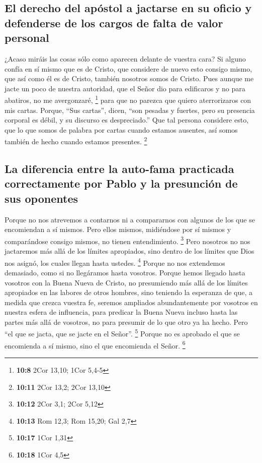 \hypertarget{el-derecho-del-apuxf3stol-a-jactarse-en-su-oficio-y-defenderse-de-los-cargos-de-falta-de-valor-personal}{%
\subsection{El derecho del apóstol a jactarse en su oficio y defenderse
de los cargos de falta de valor
personal}\label{el-derecho-del-apuxf3stol-a-jactarse-en-su-oficio-y-defenderse-de-los-cargos-de-falta-de-valor-personal}}

 ¿Acaso miráis las cosas sólo como aparecen delante de
vuestra cara? Si alguno confía en sí mismo que es de Cristo, que
considere de nuevo esto consigo mismo, que así como él es de Cristo,
también nosotros somos de Cristo.  Pues aunque me jacte un
poco de nuestra autoridad, que el Señor dio para edificaros y no para
abatiros, no me avergonzaré, \footnote{\textbf{10:8} 2Cor 13,10; 1Cor
  5,4-5}  para que no parezca que quiero aterrorizaros con
mis cartas.  Porque, ``Sus cartas'', dicen, ``son pesadas
y fuertes, pero su presencia corporal es débil, y su discurso es
despreciado.''  Que tal persona considere esto, que lo
que somos de palabra por cartas cuando estamos ausentes, así somos
también de hecho cuando estamos presentes. \footnote{\textbf{10:11} 2Cor
  13,2; 2Cor 13,10}

\hypertarget{la-diferencia-entre-la-auto-fama-practicada-correctamente-por-pablo-y-la-presunciuxf3n-de-sus-oponentes}{%
\subsection{La diferencia entre la auto-fama practicada correctamente
por Pablo y la presunción de sus
oponentes}\label{la-diferencia-entre-la-auto-fama-practicada-correctamente-por-pablo-y-la-presunciuxf3n-de-sus-oponentes}}

 Porque no nos atrevemos a contarnos ni a compararnos con
algunos de los que se encomiendan a sí mismos. Pero ellos mismos,
midiéndose por sí mismos y comparándose consigo mismos, no tienen
entendimiento. \footnote{\textbf{10:12} 2Cor 3,1; 2Cor 5,12}
 Pero nosotros no nos jactaremos más allá de los límites
apropiados, sino dentro de los límites que Dios nos asignó, los cuales
llegan hasta ustedes. \footnote{\textbf{10:13} Rom 12,3; Rom 15,20; Gal
  2,7}  Porque no nos extendemos demasiado, como si no
llegáramos hasta vosotros. Porque hemos llegado hasta vosotros con la
Buena Nueva de Cristo,  no presumiendo más allá de los
límites apropiados en las labores de otros hombres, sino teniendo la
esperanza de que, a medida que crezca vuestra fe, seremos ampliados
abundantemente por vosotros en nuestra esfera de influencia,
 para predicar la Buena Nueva incluso hasta las partes
más allá de vosotros, no para presumir de lo que otro ya ha hecho.
 Pero ``el que se jacta, que se jacte en el Señor''.
\footnote{\textbf{10:17} 1Cor 1,31}  Porque no es
aprobado el que se encomienda a sí mismo, sino el que encomienda el
Señor. \footnote{\textbf{10:18} 1Cor 4,5}


